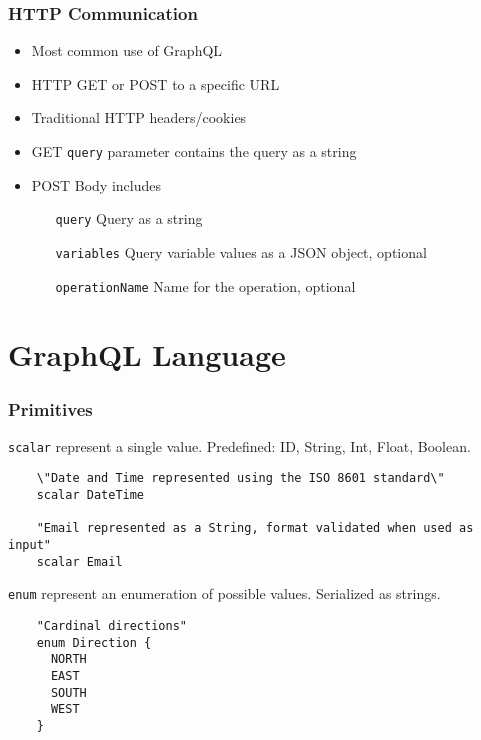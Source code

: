 \documentclass[notes]{beamer}
\begin{document}
\begin{frame}
  \frametitle{HTTP Communication}
  \begin{itemize}
  \item Most common use of GraphQL
  \item HTTP GET or POST to a specific URL
  \item Traditional HTTP headers/cookies
  \item GET \texttt{query} parameter contains the query as a string
  \item POST Body includes
    \begin{itemize}
    \item[\texttt{query}] Query as a string
    \item[\texttt{variables}] Query variable values as a JSON object, optional
    \item[\texttt{operationName}] Name for the operation, optional
    \end{itemize}
  \end{itemize}
\end{frame}


\section{GraphQL Language}
\begin{frame}[fragile]
  \frametitle{Primitives}
  \texttt{scalar} represent a single value. Predefined: ID, String, Int, Float, Boolean.
  \begin{verbatim}
    \"Date and Time represented using the ISO 8601 standard\"
    scalar DateTime

    "Email represented as a String, format validated when used as input"
    scalar Email
  \end{verbatim}

  \texttt{enum} represent an enumeration of possible values. Serialized as strings.
  \begin{verbatim}
    "Cardinal directions"
    enum Direction {
      NORTH
      EAST
      SOUTH
      WEST
    }
  \end{verbatim}
\end{frame}
\end{document}
